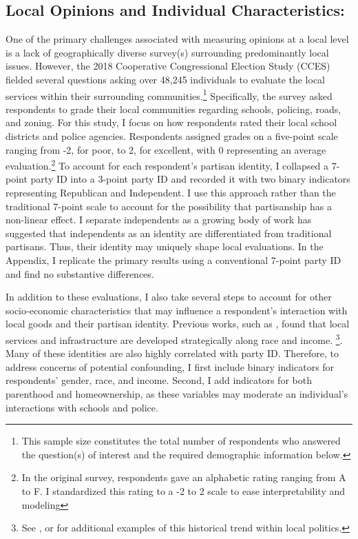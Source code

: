 \subsection{Local Opinions and Individual Characteristics:}

One of the primary challenges associated with measuring opinions at a local level is a lack of geographically diverse survey(s) surrounding predominantly local issues. However, the 2018 Cooperative Congressional Election Study (CCES) fielded several questions asking over 48,245 individuals to evaluate the local services within their surrounding communities.\footnote{This sample size constitutes the total number of respondents who answered the question(s) of interest and the required demographic information below.} Specifically, the survey asked respondents to grade their local communities regarding schools, policing, roads, and zoning. For this study, I focus on how respondents rated their local school districts and police agencies. Respondents assigned grades on a five-point scale ranging from -2, for poor, to 2, for excellent, with 0 representing an average evaluation.\footnote{In the original survey, respondents gave an alphabetic rating ranging from A to F. I standardized this rating to a -2 to 2 scale to ease interpretability and modeling} To account for each respondent's partisan identity, I collapsed a 7-point party ID into a 3-point party ID and recorded it with two binary indicators representing Republican and Independent. I use this approach rather than the traditional 7-point scale to account for the possibility that partisanship has a non-linear effect. I separate independents as a growing body of work has suggested that independents as an identity are differentiated from traditional partisans. Thus, their identity may uniquely shape local evaluations. In the Appendix, I replicate the primary results using a conventional 7-point party ID and find no substantive differences. 

In addition to these evaluations, I also take several steps to account for other socio-economic characteristics that may influence a respondent's interaction with local goods and their partisan identity. Previous works, such as \citet{trounstineRepresentationAccountabilityCities2010}, found that local services and infrastructure are developed strategically along race and income. \footnote{See \citet{einsteinWhoParticipatesLocal2019}, or \citet{anziaCollectiveBargainingTransfer2014} for additional examples of this historical trend within local politics.}. Many of these identities are also highly correlated with party ID. Therefore, to address concerns of potential confounding, I first include binary indicators for respondents' gender, race, and income. Second, I add indicators for both parenthood and homeownership, as these variables may moderate an individual's interactions with schools and police.

